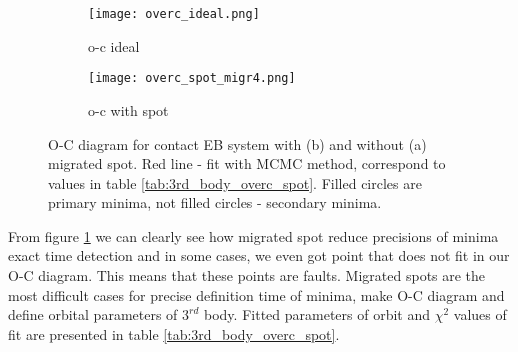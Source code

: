  
\begin{figure}[!h]
    \centering
    \begin{subfigure}[t]{0.5\textwidth}
        \centering
        \texttt{[image: overc\_ideal.png]}
        \caption{o-c ideal}
    \end{subfigure}%
    \begin{subfigure}[t]{0.5\textwidth}
        \centering
        \texttt{[image: overc\_spot\_migr4.png]}
        \caption{o-c with spot}
    \end{subfigure}
    \caption{O-C diagram for contact EB system with (b) and without (a) migrated spot.
        Red line - fit with MCMC method, correspond to values in table \ref{tab:3rd_body_overc_spot}. 
        Filled circles are primary minima, not filled circles - secondary minima.}
\label{fig:overcontact_spot_oc}
\end{figure}

From figure \ref{fig:overcontact_spot_oc} we can clearly see how migrated spot reduce precisions of minima exact time detection and in some cases, we even got point that does not fit in our O-C diagram. This means that these points are faults. Migrated spots are the most difficult cases for precise definition time of minima, make O-C diagram and define orbital parameters of $3^{rd}$ body.
Fitted parameters of orbit and $\chi^2$ values of fit are presented in table \ref{tab:3rd_body_overc_spot}. 
  

